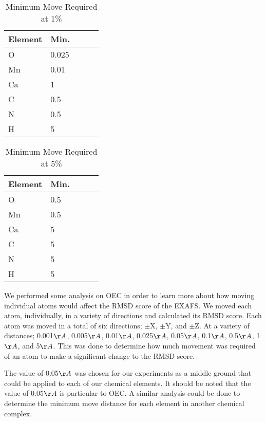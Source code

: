 \begin{table}
\caption{Minimum Move Required at 1\%}
\label{fig:localParameters}
\centering
\begin{tabular}{ | l | l | l | l | l | }
  \hline
    Element & Min. \\ \hline
    O & 0.025 \\ \hline
    Mn & 0.01 \\ \hline
    Ca & 1 \\ \hline
    C & 0.5 \\ \hline
    N & 0.5 \\ \hline
    H & 5 \\ \hline
\end{tabular}
\end{table}

\begin{table}
\caption{Minimum Move Required at 5\%}
\label{fig:localParameters}
\centering
\begin{tabular}{ | l | l | l | l | l | }
  \hline
    Element & Min. \\ \hline
    O & 0.5 \\ \hline
    Mn & 0.5 \\ \hline
    Ca & 5 \\ \hline
    C & 5 \\ \hline
    N & 5 \\ \hline
    H & 5 \\ \hline
\end{tabular}
\end{table}

We performed some analysis on OEC in order to learn more about how moving individual atoms would affect the RMSD score of the EXAFS. We moved each atom, individually, in a variety of directions and calculated its RMSD score. Each atom was moved in a total of six directions; $\pm$X, $\pm$Y, and $\pm$Z. At a variety of distances; 0.001$\AA$, 0.005$\AA$, 0.01$\AA$, 0.025$\AA$, 0.05$\AA$, 0.1$\AA$, 0.5$\AA$, 1$\AA$, and 5$\AA$. This was done to determine how much movement was required of an atom to make a significant change to the RMSD score.

The value of 0.05$\AA$ was chosen for our experiments as a middle ground that could be applied to each of our chemical elements. It should be noted that the value of 0.05$\AA$ is particular to OEC. A similar analysis could be done to determine the minimum move distance for each element in another chemical complex.